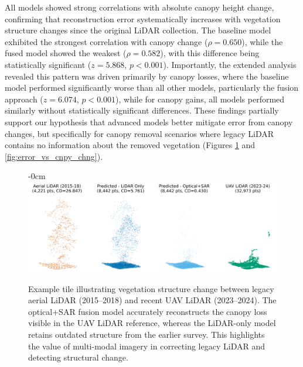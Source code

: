 \documentclass[remotesensing,article,submit,pdftex,moreauthors]{Definitions/mdpi}
\newenvironment{widefigure}[1][]{%
  \begin{figure}[#1]\begin{adjustwidth}{-\extralength}{0cm}\centering}{%
  \end{adjustwidth}\end{figure}}
\begin{document}
All models showed strong correlations with absolute canopy height change, confirming that reconstruction error systematically increases with vegetation structure changes since the original LiDAR collection. The baseline model exhibited the strongest correlation with canopy change ($\rho=0.650$), while the fused model showed the weakest ($\rho=0.582$), with this difference being statistically significant ($z=5.868$, $p<0.001$). Importantly, the extended analysis revealed this pattern was driven primarily by canopy losses, where the baseline model performed significantly worse than all other models, particularly the fusion approach ($z=6.074$, $p<0.001$), while for canopy gains, all models performed similarly without statistically significant differences. These findings partially support our hypothesis that advanced models better mitigate error from canopy changes, but specifically for canopy removal scenarios where legacy LiDAR contains no information about the removed vegetation (Figures \ref{fig:single_veg_loss_example} and \ref{fig:error_vs_cnpy_chng}).

\begin{widefigure}
    \centering
    \includegraphics[width=1\linewidth]{manuscript/figures/single_veg_loss_example.png}
    \caption{Example tile illustrating vegetation structure change between legacy aerial LiDAR (2015--2018) and recent UAV LiDAR (2023--2024). The optical+SAR fusion model accurately reconstructs the canopy loss visible in the UAV LiDAR reference, whereas the LiDAR-only model retains outdated structure from the earlier survey. This highlights the value of multi-modal imagery in correcting legacy LiDAR and detecting structural change.}
    \label{fig:single_veg_loss_example}
\end{widefigure}
\end{document}
